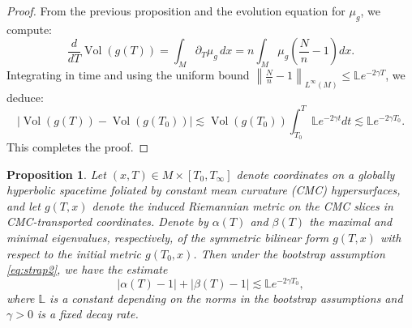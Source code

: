 \documentclass{amsart}
\newtheorem{proposition}{Proposition}[section]
\begin{document}
\begin{proof}
From the previous proposition and the evolution equation for \( \mu_g \), we compute:
\[
\frac{d}{dT} \operatorname{Vol}(g(T)) = \int_M \partial_T \mu_g \, dx = n \int_M \mu_g\left(\frac{N}{n} - 1\right) dx.
\]
Integrating in time and using the uniform bound \( \left\| \frac{N}{n} - 1 \right\|_{L^\infty(M)} \leq \mathds{L} e^{-2\gamma T} \), we deduce:
\[
\left| \operatorname{Vol}(g(T)) - \operatorname{Vol}(g(T_0)) \right| \lesssim \operatorname{Vol}(g(T_0))  \int_{T_0}^{T} \mathds{L} e^{-2\gamma t} dt \lesssim \mathds{L} e^{-2\gamma T_0}.
\]
This completes the proof.
\end{proof}
\begin{proposition}
\label{metric2}
Let $(x,T)\in M\times [T_{0},T_{\infty}]$ denote coordinates on a globally hyperbolic spacetime foliated by constant mean curvature (CMC) hypersurfaces, and let $g(T,x)$ denote the induced Riemannian metric on the CMC slices in CMC-transported coordinates. Denote by $\alpha(T)$ and $\beta(T)$ the maximal and minimal eigenvalues, respectively, of the symmetric bilinear form $g(T,x)$ with respect to the initial metric $g(T_0,x)$. Then under the bootstrap assumption \eqref{eq:strap2}, we have the estimate
\[
|\alpha(T) - 1| + |\beta(T) - 1| \lesssim \mathds{L} e^{-2\gamma T_0},
\]
where $\mathds{L}$ is a constant depending on the norms in the bootstrap assumptions and $\gamma > 0$ is a fixed decay rate.
\end{proposition}
\end{document}

